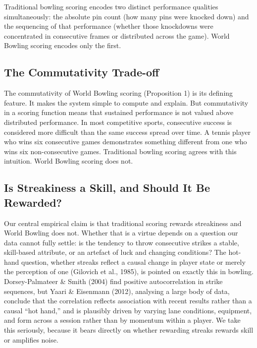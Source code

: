 \documentclass[
  letterpaper,
  DIV=11,
  numbers=noendperiod]{scrartcl}
\begin{document}
Traditional bowling scoring encodes two distinct performance qualities
simultaneously: the absolute pin count (how many pins were knocked down)
and the sequencing of that performance (whether those knockdowns were
concentrated in consecutive frames or distributed across the game).
World Bowling scoring encodes only the first.

\subsection{The Commutativity
Trade-off}\label{the-commutativity-trade-off}

The commutativity of World Bowling scoring (Proposition 1) is its
defining feature. It makes the system simple to compute and explain. But
commutativity in a scoring function means that sustained performance is
not valued above distributed performance. In most competitive sports,
consecutive success is considered more difficult than the same success
spread over time. A tennis player who wins six consecutive games
demonstrates something different from one who wins six non-consecutive
games. Traditional bowling scoring agrees with this intuition. World
Bowling scoring does not.

\subsection{Is Streakiness a Skill, and Should It Be
Rewarded?}\label{is-streakiness-a-skill-and-should-it-be-rewarded}

Our central empirical claim is that traditional scoring rewards
streakiness and World Bowling does not. Whether that is a virtue depends
on a question our data cannot fully settle: is the tendency to throw
consecutive strikes a stable, skill-based attribute, or an artefact of
luck and changing conditions? The hot-hand question, whether streaks
reflect a causal change in player state or merely the perception of one
(Gilovich et al., 1985), is pointed on exactly this in bowling.
Dorsey-Palmateer \& Smith (2004) find positive autocorrelation in strike
sequences, but Yaari \& Eisenmann (2012), analysing a large body of
data, conclude that the correlation reflects association with recent
results rather than a causal ``hot hand,'' and is plausibly driven by
varying lane conditions, equipment, and form across a session rather
than by momentum within a player. We take this seriously, because it
bears directly on whether rewarding streaks rewards skill or amplifies
noise.
\end{document}

